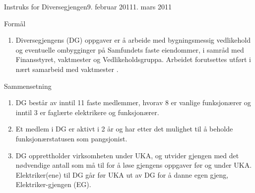 

\begin{instruks}{Instruks for Diversegjengen}{9. februar 2011}{1. mars 2011}

    \begin{instruksledd}{Formål}
        \begin{enumerate}
            \item Diversegjengens (DG) oppgaver er å arbeide med bygningsmessig vedlikehold og eventuelle
                ombygginger på Samfundets faste eiendommer, i samråd med Finansstyret, vaktmester og Vedlikeholdsgruppa.
                Arbeidet forutsettes utført i nært samarbeid med vaktmester .
        \end{enumerate}
    \end{instruksledd}

    \begin{instruksledd}{Sammensetning}
        \begin{enumerate}
            \item DG består av inntil 11 faste medlemmer, hvorav 8 er vanlige funksjonærer
                og inntil 3 er faglærte elektrikere og funksjonærer.
            \item Et medlem i DG er aktivt i 2 år og har etter det mulighet til å beholde
                funksjonærstatusen som pangsjonist.
            \item DG opprettholder virksomheten under UKA, og utvider gjengen med det nødvendige antall
                som må til for å løse gjengens oppgaver før og under UKA. Elektriker(ene) til DG går før UKA ut av DG for å
                danne egen gjeng, Elektriker-gjengen (EG).
        \end{enumerate}
    \end{instruksledd}


\end{instruks}
